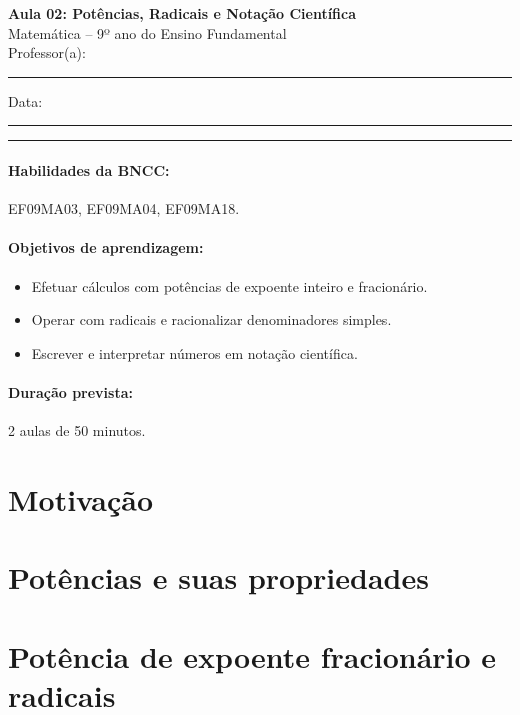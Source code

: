 \documentclass[11pt,a4paper]{article}
\newcommand{\numaula}{02}
\newcommand{\tituloaula}{Potências, Radicais e Notação Científica}
\begin{document}
\begin{center}
  {\Large\bfseries Aula \numaula: \tituloaula}\\[4pt]
  {\large Matemática -- 9º ano do Ensino Fundamental}\\[2pt]
  Professor(a): \rule{6cm}{0.4pt} \qquad Data: \rule{3cm}{0.4pt}
\end{center}
\noindent\rule{\linewidth}{0.8pt}

\paragraph{Habilidades da BNCC:} EF09MA03, EF09MA04, EF09MA18.

\paragraph{Objetivos de aprendizagem:}
\begin{itemize}[nosep]
  \item Efetuar cálculos com potências de expoente inteiro e fracionário.
  \item Operar com radicais e racionalizar denominadores simples.
  \item Escrever e interpretar números em notação científica.
\end{itemize}

\paragraph{Duração prevista:} 2 aulas de 50 minutos. %

\section{Motivação}

\section{Potências e suas propriedades}

\section{Potência de expoente fracionário e radicais}
\end{document}
